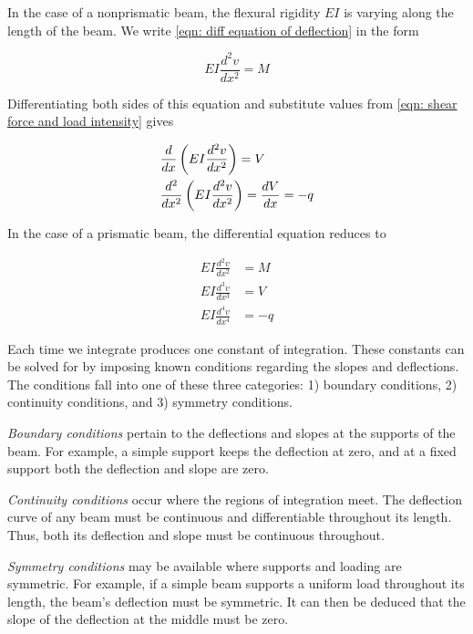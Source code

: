 \documentclass[
10pt,
a4paper,
openany,
svgnames,
]{book} %
\begin{document}
In the case of a nonprismatic beam, the flexural rigidity $EI$ is varying along the length of the beam. We write \cref{eqn: diff equation of deflection} in the form

\[EI\frac{{{d^2}v}}{{d{x^2}}} = M\]

Differentiating both sides of this equation and substitute values from \cref{eqn: shear force and load intensity} gives

\begin{equation}
  \begin{gathered}
    \frac{d}{{dx}}\left( {EI\frac{{{d^2}v}}{{d{x^2}}}} \right) = V \hfill \\
    \frac{{{d^2}}}{{d{x^2}}}\left( {EI\frac{{{d^2}v}}{{d{x^2}}}} \right) = \frac{{dV}}{{dx}} =  - q \hfill \\ 
  \end{gathered}
\end{equation}

In the case of a prismatic beam, the differential equation reduces to

\begin{align}
    EI\frac{{{d^2}v}}{{d{x^2}}} &= M \nonumber \\
    EI\frac{{{d^3}v}}{{d{x^3}}} &= V \nonumber \\
    EI\frac{{{d^4}v}}{{d{x^4}}} &=  - q 
\end{align}

Each time we integrate produces one constant of integration. These constants can be solved for by imposing known conditions regarding the slopes and deflections. The conditions fall into one of these three categories: 1) boundary conditions, 2) continuity conditions, and 3) symmetry conditions.

\emph{Boundary conditions} pertain to the deflections and slopes at the supports of the beam. For example, a simple support keeps the deflection at zero, and at a fixed support both the deflection and slope are zero.

\emph{Continuity conditions} occur where the regions of integration meet. The deflection curve of any beam must be continuous and differentiable throughout its length. Thus, both its deflection and slope must be continuous throughout.

\emph{Symmetry conditions} may be available where supports and loading are symmetric. For example, if a simple beam supports a uniform load throughout its length, the beam's deflection must be symmetric. It can then be deduced that the slope of the deflection at the middle must be zero.
\end{document}
